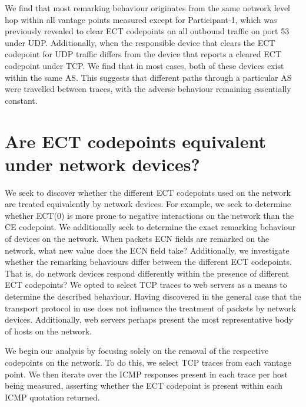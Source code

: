 \documentclass{l4proj}
\begin{document}
We find that most remarking behaviour originates from the same network level hop within all vantage points measured except for Participant-1, which was previously revealed to clear ECT codepoints on all outbound traffic on port 53 under UDP. Additionally, when the responsible device that clears the ECT codepoint for UDP traffic differs from the device that reports a cleared ECT codepoint under TCP. We find that in most cases, both of these devices exist within the same AS. This suggests that different paths through a particular AS were travelled between traces, with the adverse behaviour remaining essentially constant.

\section{Are ECT codepoints equivalent under network devices?}


We seek to discover whether the different ECT codepoints used on the network are treated equivalently by network devices. For example, we seek to determine whether ECT(0) is more prone to negative interactions on the network than the CE codepoint. We additionally seek to determine the exact remarking behaviour of devices on the network. When packets ECN fields are remarked on the network, what new value does the ECN field take? Additionally, we investigate whether the remarking behaviours differ between the different ECT codepoints. That is, do network devices respond differently within the presence of different ECT codepoints? We opted to select TCP traces to web servers as a means to determine the described behaviour. Having discovered in the general case that the transport protocol in use does not influence the treatment of packets by network devices. Additionally, web servers perhaps present the most representative body of hosts on the network.

We begin our analysis by focusing solely on the removal of the respective codepoints on the network. To do this, we select TCP traces from each vantage point. We then iterate over the ICMP responses present in each trace per host being measured, asserting whether the ECT codepoint is present within each ICMP quotation returned.
\end{document}
